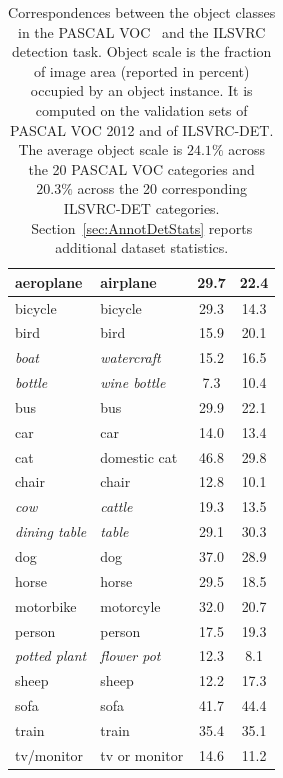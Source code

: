 \begin{table}
\begin{table}[t]
\begin{tabular}{|l|l| c| c|}
\hline
aeroplane & airplane & 29.7 & 22.4\\
\hline
bicycle & bicycle & 29.3 & 14.3 \\
\hline
bird & bird & 15.9 & 20.1 \\
\hline
\emph{boat} & \emph{watercraft} & 15.2 & 16.5 \\
\hline
\emph{bottle} & \emph{wine bottle} & 7.3 & 10.4\\
\hline
bus & bus & 29.9 & 22.1 \\
\hline
car & car & 14.0 & 13.4\\
\hline
cat & domestic cat & 46.8 & 29.8 \\
\hline
chair & chair  & 12.8 & 10.1 \\
\hline
\emph{cow} & \emph{cattle} & 19.3 & 13.5 \\
\hline
\emph{dining table} & \emph{table} & 29.1 & 30.3 \\
\hline
dog & dog & 37.0 & 28.9 \\
\hline
horse & horse & 29.5 & 18.5 \\
\hline
motorbike & motorcyle& 32.0 & 20.7 \\
\hline
person & person & 17.5 & 19.3 \\
\hline
\emph{potted plant} & \emph{flower pot} & 12.3 & 8.1\\
\hline
sheep & sheep & 12.2 & 17.3 \\
\hline
sofa & sofa & 41.7 & 44.4 \\
\hline
train & train  & 35.4 & 35.1\\
\hline
tv/monitor & tv or monitor & 14.6 & 11.2\\
\hline
\end{tabular}
\caption{Correspondences between the object classes in the PASCAL VOC~\citep{PASCALIJCV} and the ILSVRC detection task.
Object scale is the fraction of image area (reported in percent) occupied by an object instance. It is computed on the validation sets of
PASCAL VOC 2012 and of ILSVRC-DET. The average object scale is $24.1\%$  across the 20 PASCAL VOC categories 
and $20.3\%$ across the 20 corresponding ILSVRC-DET categories. Section~\ref{sec:AnnotDetStats} reports additional dataset statistics.
}
\label{table:detclassespascal}
\end{table}





\end{table}
